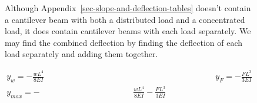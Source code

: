 \documentclass[
  letterpaper,
  DIV=11,
  numbers=noendperiod]{scrreprt}
\theoremstyle{definition}
\theoremstyle{remark}
\begin{document}
\begin{figure}


\caption{\label{fig-11.7}Although
Appendix~\ref{sec-slope-and-deflection-tables} doesn't contain a
cantilever beam with both a distributed load and a concentrated load, it
does contain cantilever beams with each load separately. We may find the
combined deflection by finding the deflection of each load separately
and adding them together.}

\end{figure}%

\[
\begin{aligned} y_w = - \frac{wL^4}{8EI} \quad \quad \quad \quad \quad \quad \quad \quad \quad \quad &\quad \quad \quad \quad \quad \quad \quad \quad \quad \quad y_F=-\frac{FL^3}{3EI} \\ y_{max}=-&\frac{wL^4}{8EI} - \frac{FL^3}{3EI} \end{aligned}
\]
\end{document}
